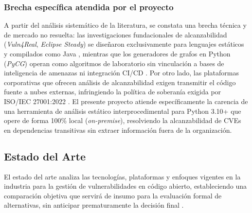 \subsubsection*{Brecha específica atendida por el proyecto}
A partir del análisis sistemático de la literatura, se constata una brecha técnica y de mercado no resuelta: las investigaciones fundacionales de alcanzabilidad (\textit{Vuln4Real}, \textit{Eclipse Steady}) se diseñaron exclusivamente para lenguajes estáticos y compilados como Java \parencite{ponta2020detection, pashchenko2022vuln4real}, mientras que los generadores de grafos en Python (\textit{PyCG}) operan como algoritmos de laboratorio sin vinculación a bases de inteligencia de amenazas ni integración CI/CD \parencite{salis2021pycg}. %
Por otro lado, las plataformas corporativas que ofrecen análisis de alcanzabilidad exigen transmitir el código fuente a nubes externas, infringiendo la política de soberanía exigida por ISO/IEC 27001:2022 \parencite{ladisa2023sok, gutierrez2024auditoria}. %
El presente proyecto atiende específicamente la carencia de una herramienta de análisis estático interprocedimental para Python 3.10+ que opere de forma 100\% local (\textit{on-premise}), resolviendo la alcanzabilidad de CVEs en dependencias transitivas sin extraer información fuera de la organización.

\subsection{Estado del Arte}
El estado del arte analiza las tecnologías, plataformas y enfoques vigentes en la industria para la gestión de vulnerabilidades en código abierto, estableciendo una comparación objetiva que servirá de insumo para la evaluación formal de alternativas, sin anticipar prematuramente la decisión final \parencite{sommerville2016software, torres2026proyecto}. %

